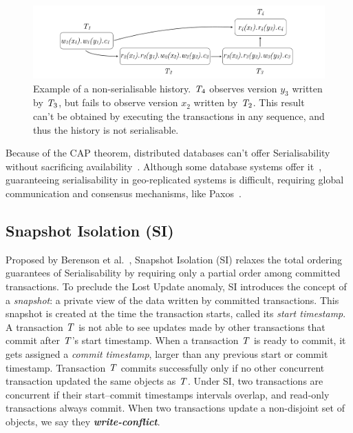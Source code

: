 \begin{figure}[h]
  \centering
  \vspace{-0.3cm}
  \includegraphics[width=\textwidth]{figures/non_ser_hist.pdf}
  \vspace{-1cm}
  \caption{Example of a non-serialisable history. $\mathit{T}_4$ observes version $y_3$ written by $\mathit{T}_3$, but fails to observe version $x_2$ written by $\mathit{T}_2$. This result can't be obtained by executing the transactions in any sequence, and thus the history is not serialisable.}
  \label{fig:non_ser_history}
\end{figure}

Because of the CAP theorem, distributed databases can't offer Serialisability without sacrificing availability~\citep{cap-brewer, cap-theorem}. Although some database systems offer it~\citep{google_spanner}, guaranteeing serialisability in geo-replicated systems is difficult, requiring global communication and consensus mechanisms, like Paxos~\citep{lamport_paxos}.

\subsection{Snapshot Isolation (SI)}
\label{sect:si}

Proposed by Berenson et al.~\citep{sql-critique}, Snapshot Isolation (SI) relaxes the total ordering guarantees of Serialisability by requiring only a partial order among committed transactions. To preclude the Lost Update anomaly, SI introduces the concept of a \emph{snapshot}: a private view of the data written by committed transactions. This snapshot is created at the time the transaction starts, called its \emph{start timestamp}. A transaction $\mathit{T}$ is not able to see updates made by other transactions that commit after $\mathit{T}$'s start timestamp. When a transaction $\mathit{T}$ is ready to commit, it gets assigned a \emph{commit timestamp}, larger than any previous start or commit timestamp. Transaction $\mathit{T}$ commits successfully only if no other concurrent transaction updated the same objects as $\mathit{T}$. Under SI, two transactions are concurrent if their start--commit timestamps intervals overlap, and read-only transactions always commit. When two transactions update a non-disjoint set of objects, we say they \textbf{\em write-conflict}.

